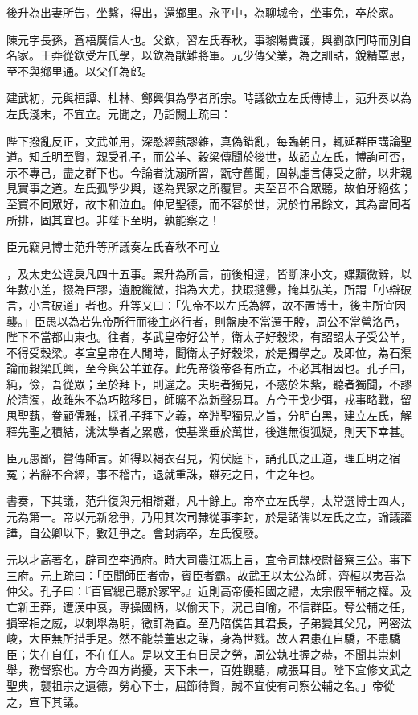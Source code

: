 \begin{pinyinscope}
後升為出妻所告，坐繫，得出，還鄉里。永平中，為聊城令，坐事免，卒於家。

陳元字長孫，蒼梧廣信人也。父欽，習左氏春秋，事黎陽賈護，與劉歆同時而別自名家。王莽從欽受左氏學，以欽為猒難將軍。元少傳父業，為之訓詁，銳精覃思，至不與鄉里通。以父任為郎。

建武初，元與桓譚、杜林、鄭興俱為學者所宗。時議欲立左氏傳博士，范升奏以為左氏淺末，不宜立。元聞之，乃詣闕上疏曰：

陛下撥亂反正，文武並用，深愍經蓺謬雜，真偽錯亂，每臨朝日，輒延群臣講論聖道。知丘明至賢，親受孔子，而公羊、穀梁傳聞於後世，故詔立左氏，博詢可否，示不專己，盡之群下也。今論者沈溺所習，翫守舊聞，固執虛言傳受之辭，以非親見實事之道。左氏孤學少與，遂為異家之所覆冒。夫至音不合眾聽，故伯牙絕弦；至寶不同眾好，故卞和泣血。仲尼聖德，而不容於世，況於竹帛餘文，其為雷同者所排，固其宜也。非陛下至明，孰能察之！

臣元竊見博士范升等所議奏左氏春秋不可立

，及太史公違戾凡四十五事。案升為所言，前後相違，皆斷涞小文，媟黷微辭，以年數小差，掇為巨謬，遺脫纖微，指為大尤，抉瑕擿釁，掩其弘美，所謂「小辯破言，小言破道」者也。升等又曰：「先帝不以左氏為經，故不置博士，後主所宜因襲。」臣愚以為若先帝所行而後主必行者，則盤庚不當遷于殷，周公不當營洛邑，陛下不當都山東也。往者，孝武皇帝好公羊，衛太子好穀梁，有詔詔太子受公羊，不得受穀梁。孝宣皇帝在人閒時，聞衛太子好穀梁，於是獨學之。及即位，為石渠論而穀梁氏興，至今與公羊並存。此先帝後帝各有所立，不必其相因也。孔子曰，純，儉，吾從眾；至於拜下，則違之。夫明者獨見，不惑於朱紫，聽者獨聞，不謬於清濁，故離朱不為巧眩移目，師曠不為新聲易耳。方今干戈少弭，戎事略戰，留思聖蓺，眷顧儒雅，採孔子拜下之義，卒淵聖獨見之旨，分明白黑，建立左氏，解釋先聖之積結，洮汰學者之累惑，使基業垂於萬世，後進無復狐疑，則天下幸甚。

臣元愚鄙，嘗傳師言。如得以褐衣召見，俯伏庭下，誦孔氏之正道，理丘明之宿冤；若辭不合經，事不稽古，退就重誅，雖死之日，生之年也。

書奏，下其議，范升復與元相辯難，凡十餘上。帝卒立左氏學，太常選博士四人，元為第一。帝以元新忿爭，乃用其次司隸從事李封，於是諸儒以左氏之立，論議讙譁，自公卿以下，數廷爭之。會封病卒，左氏復廢。

元以才高著名，辟司空李通府。時大司農江馮上言，宜令司隸校尉督察三公。事下三府。元上疏曰：「臣聞師臣者帝，賓臣者霸。故武王以太公為師，齊桓以夷吾為仲父。孔子曰：『百官總己聽於冢宰。』近則高帝優相國之禮，太宗假宰輔之權。及亡新王莽，遭漢中衰，專操國柄，以偷天下，況己自喻，不信群臣。奪公輔之任，損宰相之威，以刺舉為明，徼訐為直。至乃陪僕告其君長，子弟變其父兄，罔密法峻，大臣無所措手足。然不能禁董忠之謀，身為世戮。故人君患在自驕，不患驕臣；失在自任，不在任人。是以文王有日昃之勞，周公執吐握之恭，不聞其崇刺舉，務督察也。方今四方尚擾，天下未一，百姓觀聽，咸張耳目。陛下宜修文武之聖典，襲祖宗之遺德，勞心下士，屈節待賢，誠不宜使有司察公輔之名。」帝從之，宣下其議。


\end{pinyinscope}
